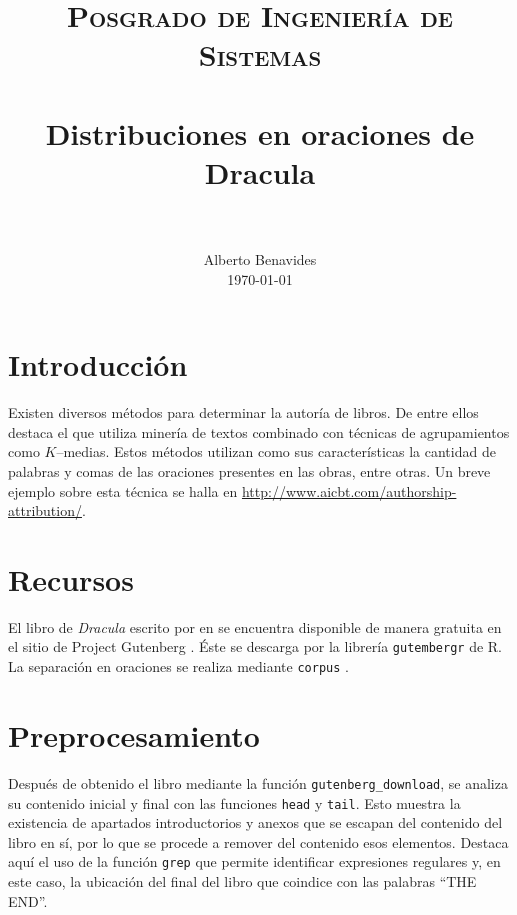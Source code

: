 \documentclass[paper=leter, fontsize=11pt]{scrartcl}
\title{
		\usefont{OT1}{bch}{b}{n}
		\normalfont \normalsize \textsc{Posgrado de Ingeniería de Sistemas} \\ [25pt]
		\horrule{0.5pt} \\[0.4cm]
		\huge Distribuciones en oraciones de Dracula \\
		\horrule{2pt} \\[0.5cm]
}
\author{
		\normalfont 								\normalsize
        Alberto Benavides\\[-3pt]		\normalsize
        \today
}
\date{}
\numberwithin{equation}{section}		%
\numberwithin{figure}{section}			%
\numberwithin{table}{section}				%
\begin{document}
\maketitle

\section{Introducción}

Existen diversos métodos para determinar la autoría de libros. De entre ellos destaca el que utiliza minería de textos combinado con técnicas de agrupamientos como $K$--medias. Estos métodos utilizan como sus características la cantidad de palabras y comas de las oraciones presentes en las obras, entre otras. Un breve ejemplo sobre esta técnica se halla en \url{http://www.aicbt.com/authorship-attribution/}.

\section{Recursos}

El libro de \textit{Dracula} \cite{dracula1897} escrito por \citeauthor*{dracula1897} en \citeyear{dracula1897} se encuentra disponible de manera gratuita en el sitio de Project Gutenberg \cite{dracula}. Éste se descarga por la librería \texttt{gutembergr} \cite{gutenbergr} de R. La separación en oraciones se realiza mediante \texttt{corpus} \cite{corpus}.

\section{Preprocesamiento}
Después de obtenido el libro mediante la función \texttt{gutenberg\_download}, se analiza su contenido inicial y final con las funciones \texttt{head} y \texttt{tail}. Esto muestra la existencia de apartados introductorios y anexos que se escapan del contenido del libro en sí, por lo que se procede a remover del contenido esos elementos. Destaca aquí el uso de la función \texttt{grep} que permite identificar expresiones regulares y, en este caso, la ubicación del final del libro que coindice con las palabras ``THE END''.
\end{document}
